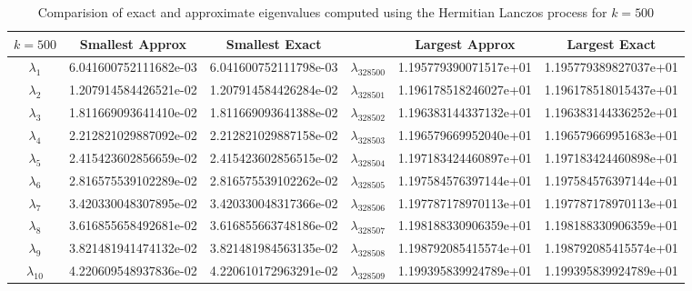 \documentclass[12pt]{article}
\begin{document}
\begin{itemize}
\begin{table}[H]
\renewcommand{\arraystretch}{1.5}
\begin{small}
\hspace{-.9in}
\begin{tabular}{| c | c | c || c | c | c |}
\hline
$k = 500$ &  \textbf{Smallest Approx} & \textbf{Smallest Exact} &   & \textbf{Largest Approx} & \textbf{Largest Exact}\\
\hline 
\hline
$\lambda_1$  & 6.041600752111682e-03  & 6.041600752111798e-03  & $\lambda_{328500}$  & 1.195779390071517e+01  &  1.195779389827037e+01 \\
$\lambda_2$  & 1.207914584426521e-02  &  1.207914584426284e-02 & $\lambda_{328501}$  & 1.196178518246027e+01  &  1.196178518015437e+01 \\
$\lambda_3$  & 1.811669093641410e-02  &  1.811669093641388e-02 & $\lambda_{328502}$  & 1.196383144337132e+01  &  1.196383144336252e+01 \\
$\lambda_4$  & 2.212821029887092e-02  & 2.212821029887158e-02  & $\lambda_{328503}$  & 1.196579669952040e+01  &  1.196579669951683e+01 \\
$\lambda_5$  & 2.415423602856659e-02  & 2.415423602856515e-02  & $\lambda_{328504}$  & 1.197183424460897e+01  &  1.197183424460898e+01 \\
$\lambda_6$  & 2.816575539102289e-02  & 2.816575539102262e-02  & $\lambda_{328505}$  & 1.197584576397144e+01  &  1.197584576397144e+01 \\
$\lambda_7$  & 3.420330048307895e-02  & 3.420330048317366e-02  & $\lambda_{328506}$  & 1.197787178970113e+01  &  1.197787178970113e+01 \\
$\lambda_8$  & 3.616855658492681e-02  & 3.616855663748186e-02  & $\lambda_{328507}$  & 1.198188330906359e+01  &  1.198188330906359e+01 \\
$\lambda_9$  & 3.821481941474132e-02  & 3.821481984563135e-02  & $\lambda_{328508}$  & 1.198792085415574e+01  &  1.198792085415574e+01 \\
$\lambda_{10}$  &  4.220609548937836e-02 & 4.220610172963291e-02  & $\lambda_{328509}$  & 1.199395839924789e+01  &  1.199395839924789e+01 \\
\hline
\end{tabular}
\end{small}
\caption{Comparision of exact and approximate eigenvalues computed using the Hermitian Lanczos process for $k = 500$}
\end{table} 


\end{itemize}
\end{document}
